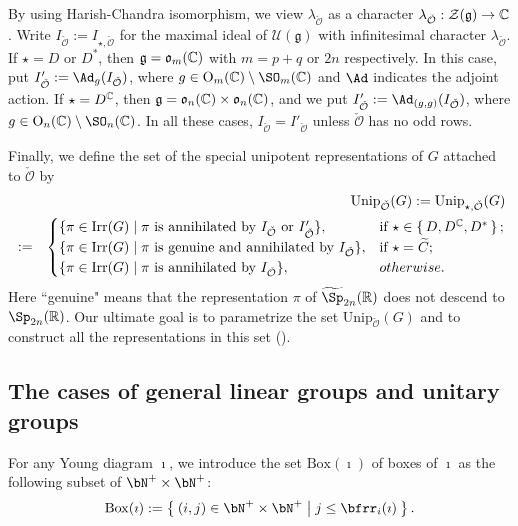 \documentclass[12pt,a4paper]{amsart}
\newcommand{\CO}{{\mathcal {O}}}
\newcommand{\oO}{\operatorname{O}}
\newcommand{\g}{\mathfrak g}
\renewcommand{\o}{\mathfrak o}
\newcommand{\R}{\mathbb R}
\numberwithin{equation}{section}
\theoremstyle{remark}
\def\Irr{\mathrm{Irr}}
\def\Unip{\mathrm{Unip}}
\begin{document}
By using  Harish-Chandra isomorphism, we view $\lambda_{\check \CO}$ as a character $\lambda_{\check \CO}: \mathcal Z(\g)\rightarrow \C$. Write $I_{\check \CO}:=I_{\star, \check \CO}$ for the maximal ideal of $\mathcal U(\g)$ with infinitesimal character $\lambda_{\check \CO}$. If $\star=D$ or $D^*$, then $\g=\o_{m}(\C)$ with $m=p+q$  or $2n$ respectively. In this case, put $I'_{\check \CO}:=\Ad_g(I_{\check \CO})$, where $g\in \oO_m(\C)\setminus \SO_m(\C)$ and $\Ad$ indicates the adjoint action. If $\star=D^{\mathbb{C}}$, then $\g=\o_{n}(\C)\times \o_n(\C)$, and we put $I'_{\check \CO}:=\Ad_{(g,g)}(I_{\check \CO})$, where $g\in \oO_n(\C)\setminus \SO_n(\C)$. In all these  cases, $I_{\check \CO}=I'_{\check \CO}$ unless $\check \CO$ has no odd rows. 

Finally, we define the set of the special unipotent representations of $G$ attached to $\check \CO$ by
\begin{eqnarray*}
&&\Unip_{\check \CO}(G):= \Unip_{\star, \check \CO}(G) \\
&:=& \begin{cases}
   \{\pi\in \Irr(G)\mid \pi \textrm{ is annihilated by $ I_{\check \CO}$ or $I'_{\check \CO}$}\}, & \text{if } \star \in \set{D, D^\C, D^*};\\
  \{\pi\in \Irr(G)\mid \pi \textrm{ is genuine  and annihilated by } I_{\check \CO}\}, & \text{if } \star =\widetilde C;\\
   \{\pi\in \Irr(G)\mid \pi \textrm{ is annihilated by } I_{\check \CO}\}, & otherwise.\\
      \end{cases}
\end{eqnarray*}
Here ``genuine" means that the representation $\pi$ of $\widetilde \Sp_{2n}(\R)$ does not descend to $\Sp_{2n}(\R)$.
Our ultimate goal is to parametrize the set $\Unip_{\check \CO}(G)$ and to construct  all the representations in this set (\cite{BMSZ2}). 




\subsection{The cases of general linear groups and unitary groups}

For any Young diagram $\imath$, we introduce the set $\mathrm{Box}(\imath)$ of boxes of $\imath$ as the following subset
of $\bN^+\times \bN^+$: 
\begin{equation}\label{eq:BOX}
\mathrm{Box}(\imath):=\Set{(i,j)\in\bN^+\times \bN^+| j\leq \bfrr_i(\imath)}.
\end{equation}
\end{document}
